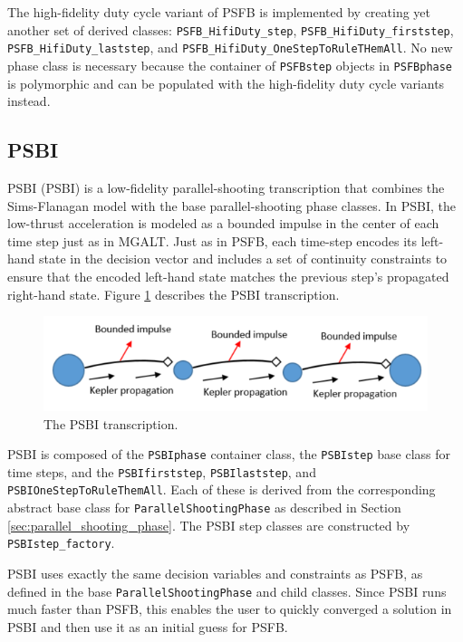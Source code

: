 The high-fidelity duty cycle variant of \ac{PSFB} is implemented by creating yet another set of derived classes: \texttt{PSFB\_HifiDuty\_step}, \texttt{PSFB\_HifiDuty\_firststep}, \texttt{PSFB\_HifiDuty\_laststep}, and \texttt{PSFB\_HifiDuty\_OneStepToRuleTHemAll}. No new phase class is necessary because the container of \texttt{PSFBstep} objects in \texttt{PSFBphase} is polymorphic and can be populated with the high-fidelity duty cycle variants instead.

\subsection{PSBI}
\label{subsec:PSBI}

\acl{PSBI} (\acs{PSBI}) is a low-fidelity parallel-shooting transcription that combines the Sims-Flanagan model \cite{SimsFlanagan1999} with the base parallel-shooting phase classes. In \ac{PSBI}, the low-thrust acceleration is modeled as a bounded impulse in the center of each time step just as in \ac{MGALT}. Just as in \ac{PSFB}, each time-step encodes its left-hand state in the decision vector and includes a set of continuity constraints to ensure that the encoded left-hand state matches the previous step's propagated right-hand state. Figure \ref{fig:PSBI_diagram} describes the \ac{PSBI} transcription.

\begin{figure}[hb]
	\centering
	\includegraphics[width=0.8\linewidth]{./mission/PSBI.png}
	\caption{ The \ac{PSBI} transcription.}
	\label{fig:PSBI_diagram}
\end{figure}

\ac{PSBI} is composed of the \texttt{PSBIphase} container class, the \texttt{PSBIstep} base class for time steps, and the \texttt{PSBIfirststep}, \texttt{PSBIlaststep}, and \texttt{PSBIOneStepToRuleThemAll}. Each of these is derived from the corresponding abstract base class for \texttt{ParallelShootingPhase} as described in Section \ref{sec:parallel_shooting_phase}. The \ac{PSBI} step classes are constructed by \texttt{PSBIstep\_factory}.

\ac{PSBI} uses exactly the same decision variables and constraints as \ac{PSFB}, as defined in the base \texttt{ParallelShootingPhase} and child classes. Since \ac{PSBI} runs much faster than \ac{PSFB}, this enables the user to quickly converged a solution in \ac{PSBI} and then use it as an initial guess for \ac{PSFB}.

